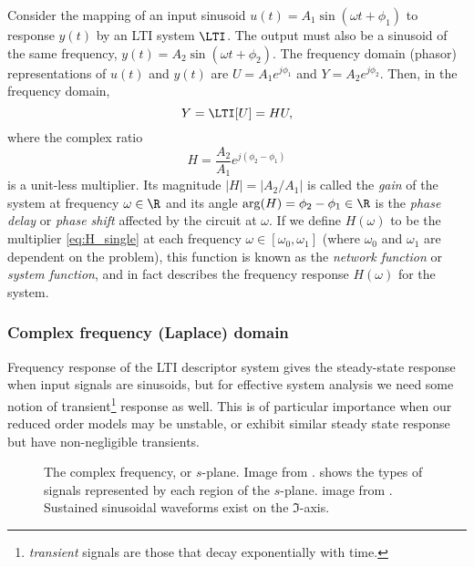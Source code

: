 Consider the mapping of an input sinusoid $u(t)=A_1\sin(\omega t+\phi_1)$  to response $y(t)$ by an LTI system $\LTI$.  The output must also be a sinusoid of the same frequency,  $y(t)=A_2\sin(\omega t+\phi_2)$.  The frequency domain (phasor) representations of $u(t)$ and $y(t)$ are $U=A_1e^{j\phi_1}$ and $Y=A_2e^{j\phi_2}$.  Then, in the frequency domain,
\begin{equation}
   Y	= \LTI [U] = H U,
\label{eq:single_freq_response}
\end{equation}
where the complex ratio 
\begin{equation}
H = \frac{A_2}{A_1} e^{j(\phi_2 - \phi_1)}
\label{eq:H_single}
\end{equation}
is a unit-less multiplier.  Its magnitude $|H|=|A_2/A_1|$ is called the \emph{gain} of the system at frequency $\omega\in\R$ and its angle $\arg(H)=\phi_2 - \phi_1 \in\R$ is the  \emph{phase delay} or \emph{phase shift} affected by the circuit at $\omega$.    If we define $H(\omega)$ to be the multiplier  \eqref{eq:H_single} at each frequency $\omega\in[\omega_0, \omega_1]$ (where $\omega_0$ and $\omega_1$ are dependent on the problem), this function is known as the \emph{network function} or \emph{system function}, and in fact describes the frequency response $H(\omega)$ for the system.  

\subsubsection{Complex frequency (Laplace) domain}
Frequency response of the LTI descriptor system gives the steady-state response when input signals are sinusoids, but for effective system analysis we need some notion of transient\footnote{\emph{transient} signals are those that decay exponentially with time.} response as well.  This is of particular importance when our reduced order models may be unstable, or exhibit similar steady state response but have non-negligible transients.    
\begin{figure}[ht]
\centering
{}\qquad
{}
\caption{ The complex frequency, or $s$-plane. Image from \cite{numerixDSP}.  shows the types of signals represented by each region of the $s$-plane. image from \cite{MITlec2004}.  Sustained sinusoidal waveforms exist on the $\Im$-axis.}
\label{fig:complex_freqs}
\end{figure}

